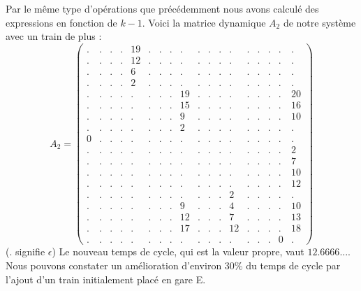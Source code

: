 Par le même type d'opérations que précédemment nous avons calculé des expressions en fonction de $k-1$.
Voici la matrice dynamique $A_2$ de notre système avec un train de plus :
\begin{equation}
A_2 = \left(\begin{array}{cccccccccccccccccc}
. & . & . & . & 19 & . & . & . & . &  . & . & . & . &  . & . & . & . & .  \\
. & . & . & . & 12 & . & . & . & . &  . & . & . & . &  . & . & . & . & .  \\
. & . & . & . & 6 &  . & . & . & . &  . & . & . & . &  . & . & . & . & .  \\
. & . & . & . & 2 &  . & . & . & . &  . & . & . & . &  . & . & . & . & .  \\
. & . & . & . & . &  . & . & . & 19 & . & . & . & . &  . & . & . & . & 20  \\
. & . & . & . & . &  . & . & . & 15 & . & . & . & . &  . & . & . & . & 16  \\
. & . & . & . & . &  . & . & . & 9 &  . & . & . & . &  . & . & . & . & 10  \\
. & . & . & . & . &  . & . & . & 2 &  . & . & . & . &  . & . & . & . & .  \\
0 & . & . & . & . &  . & . & . & . &  . & . & . & . &  . & . & . & . & .  \\
. & . & . & . & . &  . & . & . & . &  . & . & . & . &  . & . & . & . & 2  \\
. & . & . & . & . &  . & . & . & . &  . & . & . & . &  . & . & . & . & 7  \\
. & . & . & . & . &  . & . & . & . &  . & . & . & . &  . & . & . & . & 10  \\
. & . & . & . & . &  . & . & . & . &  . & . & . & . &  . & . & . & . & 12  \\
. & . & . & . & . &  . & . & . & . &  . & . & . & 2 &  . & . & . & . & .  \\
. & . & . & . & . &  . & . & . & 9 &  . & . & . & 4 &  . & . & . & . & 10  \\
. & . & . & . & . &  . & . & . & 12 & . & . & . & 7 &  . & . & . & . & 13  \\
. & . & . & . & . &  . & . & . & 17 & . & . & . & 12 & . & . & . & . & 18  \\
. & . & . & . & . &  . & . & . & . &  . & . & . & . &  . & . & . & 0 & .      
\end{array}\right)
\end{equation}
($.$ signifie $\epsilon$)
Le nouveau temps de cycle, qui est la valeur propre, vaut $ 12.6666...$. Nous pouvons constater un amélioration d'environ $30\%$ du temps de cycle par l'ajout d'un train initialement placé en gare E.

